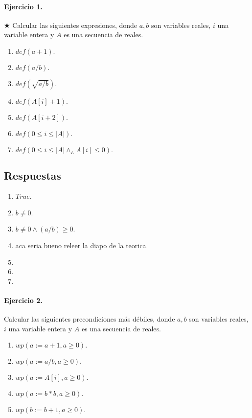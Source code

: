 \documentclass{article}
\begin{document}

\paragraph{Ejercicio 1.} $\bigstar$ Calcular las siguientes expresiones, donde $a, b$ son variables 
reales, $i$ una variable entera y $A$ es una secuencia
de reales.

\begin{enumerate}[label=\alph*)]
\item $def(a + 1).$
\item $def(a/b).$
\item $def( \sqrt{a/b}).$
\item $def(A[i] + 1).$
\item $def(A[i + 2]).$
\item $def(0 \leq i \leq |A|).$
\item $def(0 \leq i \leq |A| \wedge_L A[i] \leq 0).$
\end{enumerate}

\subsection*{Respuestas}

\begin{enumerate}[label=\alph*)]
  \item $True$.
  \item $b\neq 0$.
  \item $b\neq 0\wedge (a/b)\geq 0$.
  \item aca seria bueno releer la diapo de la teorica
  \item
  \item
  \item
\end{enumerate}

\paragraph{Ejercicio 2.} Calcular las siguientes precondiciones más débiles, donde 
$a, b$ son variables reales, $i$ una variable entera y $A$ es
una secuencia de reales.

\begin{enumerate}[label=\alph*)]
\item $wp(a := a+1, a \geq 0).$
\item $wp(a := a/b, a \geq 0).$
\item $wp(a := A[i], a \geq 0).$
\item $wp(a := b*b, a \geq 0).$
\item $wp(b := b+1, a \geq 0).$
\end{enumerate}
\end{document}
